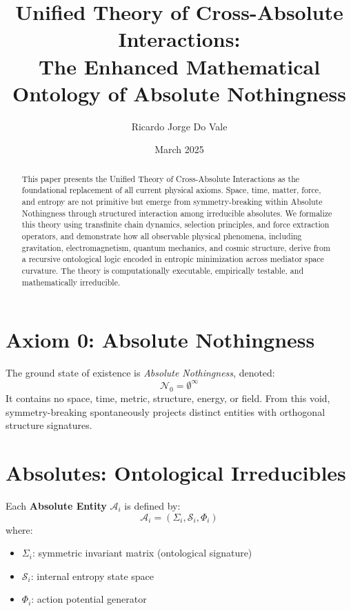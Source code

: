 \documentclass[11pt]{article}
\title{\textbf{Unified Theory of Cross-Absolute Interactions:\\ The Enhanced Mathematical Ontology of Absolute Nothingness}}
\author[1]{Ricardo Jorge Do Vale}
\affil[1]{Founder and CEO, RJV Technologies Ltd \\ Unified Physics Division\\ \texttt{ricardo@rjv-technologies.com}}
\date{March 2025}
\begin{document}
\maketitle

\begin{abstract}
This paper presents the Unified Theory of Cross-Absolute Interactions as the foundational replacement of all current physical axioms. Space, time, matter, force, and entropy are not primitive but emerge from symmetry-breaking within Absolute Nothingness through structured interaction among irreducible absolutes. We formalize this theory using transfinite chain dynamics, selection principles, and force extraction operators, and demonstrate how all observable physical phenomena, including gravitation, electromagnetism, quantum mechanics, and cosmic structure, derive from a recursive ontological logic encoded in entropic minimization across mediator space curvature. The theory is computationally executable, empirically testable, and mathematically irreducible.
\end{abstract}

\tableofcontents

\newpage

\section{Axiom 0: Absolute Nothingness}

The ground state of existence is \textit{Absolute Nothingness}, denoted:
\[
\mathcal{N}_0 = \emptyset^\infty
\]
It contains no space, time, metric, structure, energy, or field. From this void, symmetry-breaking spontaneously projects distinct entities with orthogonal structure signatures.

\section{Absolutes: Ontological Irreducibles}

Each \textbf{Absolute Entity} \(\mathcal{A}_i\) is defined by:
\[
\mathcal{A}_i = \left( \Sigma_i, \mathcal{S}_i, \Phi_i \right)
\]
where:
\begin{itemize}[noitemsep]
    \item \(\Sigma_i\): symmetric invariant matrix (ontological signature)
    \item \(\mathcal{S}_i\): internal entropy state space
    \item \(\Phi_i\): action potential generator
\end{itemize}
\end{document}
